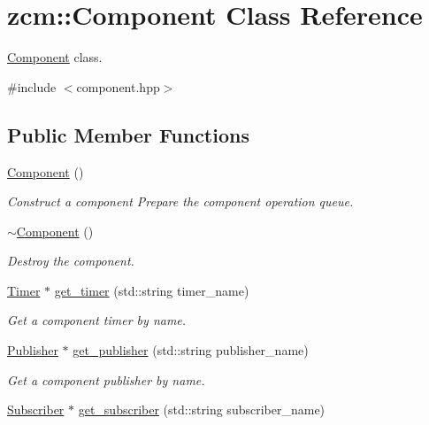 \hypertarget{classzcm_1_1Component}{}\section{zcm\+:\+:Component Class Reference}
\label{classzcm_1_1Component}


\hyperlink{classzcm_1_1Component}{Component} class.  




{\ttfamily \#include $<$component.\+hpp$>$}

\subsection*{Public Member Functions}
\begin{DoxyCompactItemize}
\item 
\hyperlink{classzcm_1_1Component_a6fd6b1f309a6b464a14c22a94d18f040}{Component} ()
\begin{DoxyCompactList}\small\item\em Construct a component Prepare the component operation queue. \end{DoxyCompactList}\item 
\hyperlink{classzcm_1_1Component_a0bab6bb89e49affa281179f5d6aeff6a}{$\sim$\+Component} ()
\begin{DoxyCompactList}\small\item\em Destroy the component. \end{DoxyCompactList}\item 
\hyperlink{classzcm_1_1Timer}{Timer} $\ast$ \hyperlink{classzcm_1_1Component_a9fe1a846945403f152e069917f2f49b2}{get\+\_\+timer} (std\+::string timer\+\_\+name)
\begin{DoxyCompactList}\small\item\em Get a component timer by name. \end{DoxyCompactList}\item 
\hyperlink{classzcm_1_1Publisher}{Publisher} $\ast$ \hyperlink{classzcm_1_1Component_a9bbbc50ea3f1a278bf74848f784df493}{get\+\_\+publisher} (std\+::string publisher\+\_\+name)
\begin{DoxyCompactList}\small\item\em Get a component publisher by name. \end{DoxyCompactList}\item 
\hyperlink{classzcm_1_1Subscriber}{Subscriber} $\ast$ \hyperlink{classzcm_1_1Component_a4865551765c7d0ead713ad65571aa8dc}{get\+\_\+subscriber} (std\+::string subscriber\+\_\+name)

\end{DoxyCompactItemize}
